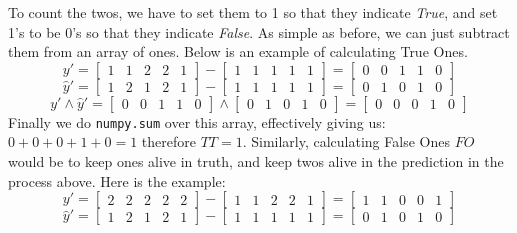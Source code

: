 \documentclass[12pt,reqno]{amsart}
\newcommand{\code}[1]{\texttt{#1}}
\begin{document}
To count the twos, we have to set them to 1 so that they indicate \textit{True}, and set 1's to be 0's so that they indicate \textit{False}. As simple as before, we can just subtract them from an array of ones. Below is an example of calculating True Ones.
$$
y' = \left[\begin{matrix} 1 & 1 & 2 & 2 & 1 \end{matrix} \right] -  \left[\begin{matrix} 1 & 1 & 1 & 1 & 1 \end{matrix} \right] = \left[\begin{matrix} 0 & 0 & 1 & 1 & 0 \end{matrix} \right]
$$
$$
\hat{y}' = \left[\begin{matrix}1 & 2 & 1 & 2 & 1 \end{matrix} \right]  -  \left[\begin{matrix} 1 & 1 & 1 & 1 & 1 \end{matrix} \right] = \left[\begin{matrix} 0 & 1 & 0 & 1 & 0\end{matrix} \right]
$$
$$
y' \land \hat{y}' = \left[\begin{matrix} 0 & 0 & 1 & 1 & 0 \end{matrix} \right] \land \left[\begin{matrix} 0 & 1 & 0 & 1 & 0\end{matrix} \right] =  \left[\begin{matrix} 0 & 0 & 0 & 1 & 0 \end{matrix} \right]
$$
Finally we do \code{numpy.sum} over this array, effectively giving us: $0 + 0 + 0 + 1 + 0 = 1$
therefore $TT = 1$. Similarly, calculating False Ones $FO$ would be to keep ones alive in truth, and keep twos alive in the prediction in the process above. Here is the example:
$$
y' = \left[\begin{matrix} 2 & 2 & 2 & 2 & 2 \end{matrix} \right] - \left[\begin{matrix} 1 & 1 & 2 & 2 & 1 \end{matrix} \right] = \left[\begin{matrix} 1 & 1 & 0 & 0 & 1 \end{matrix} \right]
$$
$$
\hat{y}' = \left[\begin{matrix}1 & 2 & 1 & 2 & 1 \end{matrix} \right]  -  \left[\begin{matrix} 1 & 1 & 1 & 1 & 1 \end{matrix} \right] = \left[\begin{matrix} 0 & 1 & 0 & 1 & 0\end{matrix} \right]
$$
\end{document}
